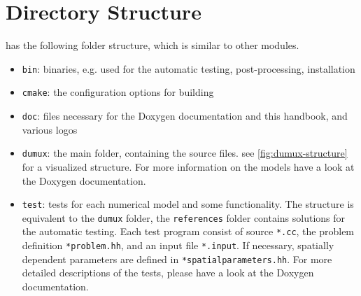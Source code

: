 \section{Directory Structure}
\label{sc_structure}

\Dumux has the following folder structure, which is similar to other \Dune modules.
\begin{itemize}
\item \texttt{bin}: binaries, e.g. used for the automatic testing, post-processing, installation
\item \texttt{cmake}: the configuration options for building \Dumux
\item \texttt{doc}: files necessary for the Doxygen documentation and this handbook, and various logos
\item \texttt{dumux}: the main folder, containing the source files. see \ref{fig:dumux-structure}
      for a visualized structure. For more information on the models have a look at the
      Doxygen documentation.
\item \texttt{test}: tests for each numerical model and some functionality.
      The structure is equivalent to the \texttt{dumux} folder, the \texttt{references} folder
      contains solutions for the automatic testing. Each test program consist of source
      \texttt{*.cc}, the problem definition \texttt{*problem.hh}, and an input file \texttt{*.input}.
      If necessary, spatially dependent parameters are defined in \texttt{*spatialparameters.hh}.
      For more detailed descriptions of the tests, please have a look at the Doxygen documentation.
\end{itemize}

